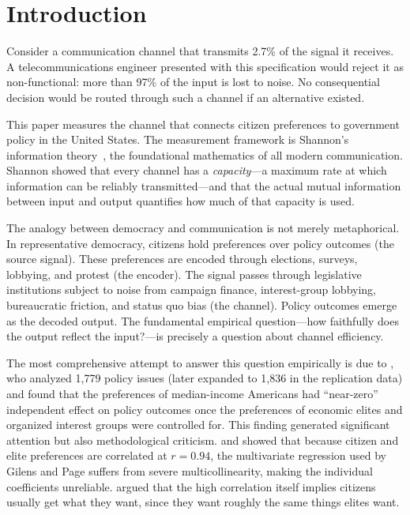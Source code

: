 \documentclass[twocolumn,10pt]{article}
\begin{document}
\section{Introduction}
\label{sec:intro}

Consider a communication channel that transmits 2.7\% of the signal it receives.  A telecommunications engineer presented with this specification would reject it as non-functional: more than 97\% of the input is lost to noise.  No consequential decision would be routed through such a channel if an alternative existed.

This paper measures the channel that connects citizen preferences to government policy in the United States.  The measurement framework is Shannon's information theory~\citep{shannon1948}, the foundational mathematics of all modern communication.  Shannon showed that every channel has a \emph{capacity}---a maximum rate at which information can be reliably transmitted---and that the actual mutual information between input and output quantifies how much of that capacity is used.

The analogy between democracy and communication is not merely metaphorical.  In representative democracy, citizens hold preferences over policy outcomes (the source signal).  These preferences are encoded through elections, surveys, lobbying, and protest (the encoder).  The signal passes through legislative institutions subject to noise from campaign finance, interest-group lobbying, bureaucratic friction, and status quo bias (the channel).  Policy outcomes emerge as the decoded output.  The fundamental empirical question---how faithfully does the output reflect the input?---is precisely a question about channel efficiency.

The most comprehensive attempt to answer this question empirically is due to \citet{gilens2014testing}, who analyzed 1,779 policy issues (later expanded to 1,836 in the replication data) and found that the preferences of median-income Americans had ``near-zero'' independent effect on policy outcomes once the preferences of economic elites and organized interest groups were controlled for.  This finding generated significant attention but also methodological criticism.  \citet{bashir2015} and \citet{branham2017} showed that because citizen and elite preferences are correlated at $r = 0.94$, the multivariate regression used by Gilens and Page suffers from severe multicollinearity, making the individual coefficients unreliable.  \citet{enns2015} argued that the high correlation itself implies citizens usually get what they want, since they want roughly the same things elites want.
\end{document}
